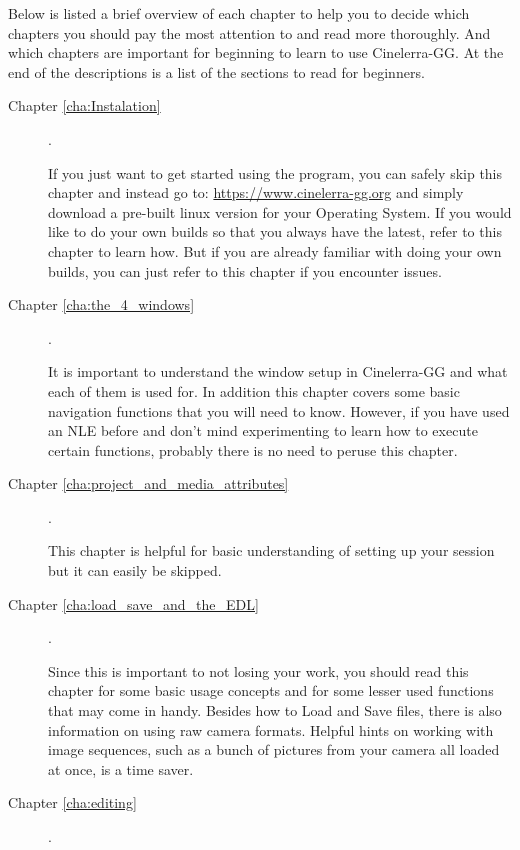 Below is listed a brief overview of each chapter to help you to decide which chapters you should pay the most attention to and read more thoroughly. 
And which chapters are important for beginning to learn to use Cinelerra-GG. At the end of the descriptions is a list of the sections to read for beginners.

\begin{description}
    \item[Chapter \ref{cha:Instalation} ] .

        If you just want to get started using the program, you can safely skip this chapter and instead go to:
        \url{https://www.cinelerra-gg.org}
        and simply download a pre-built linux version for your Operating System. If you would like to do your own builds so that you always have the latest, refer to this chapter to learn how. 
        But if you are already familiar with doing your own builds, you can just refer to this chapter if you encounter issues.
    \item[Chapter \ref{cha:the_4_windows} ] .

        It is important to understand the window setup in Cinelerra-GG and what each of them is used for. 
        In addition this chapter covers some basic navigation functions that you will need to know. 
        However, if you have used an NLE before and don’t mind experimenting to learn how to execute certain functions, probably there is no need to peruse this chapter.
    \item[Chapter \ref{cha:project_and_media_attributes}] .

        This chapter is helpful for basic understanding of setting up your session but it can easily be skipped.

    \item[Chapter \ref{cha:load_save_and_the_EDL}] .

        Since this is important to not losing your work, you should read this chapter for some basic usage concepts and for some lesser used functions that may come in handy. 
        Besides how to Load and Save files, there is also information on using raw camera formats. 
        Helpful hints on working with image sequences, such as a bunch of pictures from your camera all loaded at once, is a time saver.

    \item[Chapter \ref{cha:editing}] .


\end{description}
